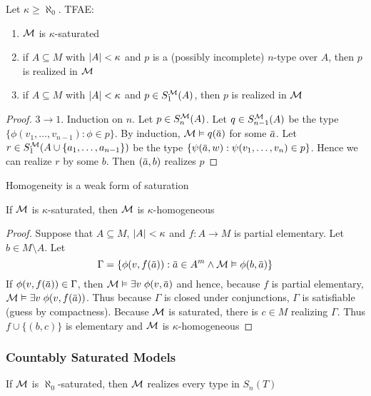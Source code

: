 \documentclass[11pt]{article}
\begin{document}
\begin{proposition}[]
Let \(\kappa\ge\aleph_0\). TFAE:
\begin{enumerate}
\item \(\mathcal{M}\) is \(\kappa\)-saturated
\item if \(A\subseteq M\) with \(\abs{A}<\kappa\) and \(p\) is a (possibly incomplete) \(n\)-type over \(A\),
then \(p\) is realized in \(\mathcal{M}\)
\item if \(A\subseteq M\) with \(\abs{A}<\kappa\) and \(p\in S_1^{\mathcal{M}}(A)\), then \(p\) is realized in \(\mathcal{M}\)
\end{enumerate}
\end{proposition}

\begin{proof}
\(3\to 1\). Induction on \(n\). Let \(p\in S_n^{\mathcal{M}}(A)\). Let \(q\in S_{n-1}^{\mathcal{M}}(A)\) be the
type \(\{\phi(v_1,\dots,v_{n-1}):\phi\in p\}\). By induction, \(\calm\vDash q(\bara)\) for some \(\bara\).
Let \(r\in S_1^{\mathcal{M}}(A\cup\{a_1,\dots,a_{n-1}\})\) be the type \(\{\psi(\bara,w):\psi(v_1,\dots,v_n)\in p\}\). Hence we can
realize \(r\) by some \(b\). Then \((\bara,b)\) realizes \(p\)
\end{proof}

Homogeneity is a weak form of saturation

\begin{proposition}[]
\label{prop4.3.3}
If \(\mathcal{M}\) is \(\kappa\)-saturated, then \(\mathcal{M}\)  is \(\kappa\)-homogeneous
\end{proposition}

\begin{proof}
Suppose that \(A\subseteq M\), \(\abs{A}<\kappa\) and \(f:A\to M\) is partial elementary. Let \(b\in M\setminus A\). Let
\begin{equation*}
\Gamma=\{\phi(v,f(\bara)):\bara\in A^m\wedge\calm\vDash\phi(b,\bara)\}
\end{equation*}
If \(\phi(v,f(\bara))\in\Gamma\), then \(\calm\vDash\exists v\;\phi(v,\bara)\) and hence, because \(f\) is partial
elementary, \(\calm\vDash\exists v\;\phi(v,f(\bara))\). Thus because \(\Gamma\) is closed under conjunctions, \(\Gamma\) is
satisfiable (guess by compactness). Because \(\mathcal{M}\) is saturated, there is \(c\in M\) realizing \(\Gamma\). Thus \(f\cup\{(b,c)\}\) is
elementary and \(\mathcal{M}\) is \(\kappa\)-homogeneous
\end{proof}

\subsubsection{Countably Saturated Models}
\label{sec:org6ca7a5e}
If \(\mathcal{M}\) is \(\aleph_0\)-saturated, then \(\mathcal{M}\) realizes every type in \(S_n(T)\)
\end{document}
